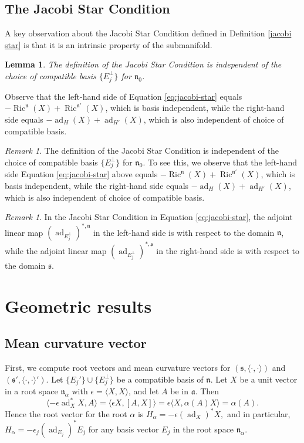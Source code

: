 \documentclass[12pt]{amsart}
\newcommand{\la}{\langle}
\newcommand{\ra}{\rangle}
\newcommand{\frakn}{\ensuremath{\mathfrak{n}} }
\newcommand{\fraks}{\ensuremath{\mathfrak{s}} }
\renewcommand\a{{\mathfrak{a}}}
\newcommand\n{{\mathfrak{n}}}
\newcommand\ip{{\langle\cdot {,} \cdot\rangle}}
\newcommand\ad{\operatorname{ad}}
\newcommand{\Ric}{\operatorname{Ric}}
\theoremstyle{plain}
\newtheorem{lemma}[theorem]{Lemma}
\theoremstyle{definition}
\theoremstyle{remark}
\newtheorem{remark}[theorem]{Remark}
\numberwithin{equation}{section}
\numberwithin{theorem}{section}
\begin{document}
\subsection{The Jacobi Star Condition}

A key observation about the  Jacobi Star Condition defined in Definition \ref{jacobi star} is that it is an intrinsic property of the submanifold.
\begin{lemma}\label{jacobi-star-basis-indep}
    The definition of the Jacobi Star Condition 
is independent of the choice of compatible basis 
$\{E_j^\perp\}$ for $\n_0$. 
\end{lemma}
Observe that the left-hand side of Equation \eqref{eq:jacobi-star} 
equals 
$-\Ric^\n (X) + \Ric^{\n'} (X)$, which is basis independent, while the right-hand side  equals $-\ad_H (X) + \ad_{H'} (X)$, which is also independent of choice of compatible basis.

\iffalse
\begin{remark}\label{jacobi-star-basis-indep} The definition of the Jacobi Star Condition 
is independent of the choice of compatible basis 
$\{E_j^\perp\}$ for $\n_0$. 
To see this, we observe that the left-hand side  Equation \eqref{eq:jacobi-star} above equals 
$-\Ric^\n (X) + \Ric^{\n'} (X)$, which is basis independent, while the right-hand side  equals $-\ad_H (X) + \ad_{H'} (X)$, which is also independent of choice of compatible basis.
\end{remark}
\else


\begin{remark}
In the Jacobi Star Condition in Equation \eqref{eq:jacobi-star}, the adjoint linear map $(\ad_{E_j^\perp})^{\ast,\frakn}$ in the left-hand side is with respect to the domain
$\frakn$, while the adjoint linear map $(\ad_{E_j^\perp})^{\ast, \fraks}$ in the right-hand side  is with respect to the domain $\fraks$. 
\end{remark}

\section{Geometric results}\label{section: geometric results}
\subsection{Mean curvature vector}\label{subsection-mcv}
First, we compute  root vectors and mean curvature vectors  
 for $(\fraks,\ip)$ and $(\fraks',\ip')$.
 Let $\{E_j'\} \cup \{ E_j^\perp \}$ be a compatible basis of
$\frakn$.  Let $X$ be a unit vector in a root space $\frakn_\alpha$
with $\epsilon = \la X, X \ra$, and let $A$ be in $\a$.  Then
\[ \la -\epsilon \ad_{X}^* X, A \ra = \la \epsilon X, [A, X] \ra = \epsilon\la X, \alpha(A)X\ra = \alpha(A).\]
  Hence   the root vector for the root $\alpha$ is  
 $  H_\alpha = -\epsilon (\ad_{X})^* X,$ and in 
 particular,     
$H_\alpha = -\epsilon_j (\ad_{E_j})^* E_j$ for any basis vector $E_j$ in the root space $\frakn_\alpha$.
\end{document}
